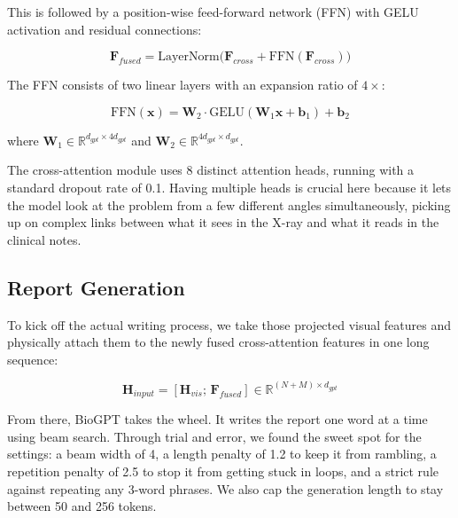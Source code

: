 \documentclass[conference]{IEEEtran}
\begin{document}
This is followed by a position-wise feed-forward network (FFN) with GELU activation and residual connections:

\begin{equation}
    \mathbf{F}_{fused} = \text{LayerNorm}\Big(\mathbf{F}_{cross} + \text{FFN}(\mathbf{F}_{cross})\Big)
\end{equation}

The FFN consists of two linear layers with an expansion ratio of $4\times$:

\begin{equation}
    \text{FFN}(\mathbf{x}) = \mathbf{W}_2 \cdot \text{GELU}(\mathbf{W}_1 \mathbf{x} + \mathbf{b}_1) + \mathbf{b}_2
\end{equation}

\noindent where $\mathbf{W}_1 \in \mathbb{R}^{d_{gpt} \times 4d_{gpt}}$ and $\mathbf{W}_2 \in \mathbb{R}^{4d_{gpt} \times d_{gpt}}$.

The cross-attention module uses 8 distinct attention heads, running with a standard dropout rate of 0.1. Having multiple heads is crucial here because it lets the model look at the problem from a few different angles simultaneously, picking up on complex links between what it sees in the X-ray and what it reads in the clinical notes.

\subsection{Report Generation}
To kick off the actual writing process, we take those projected visual features and physically attach them to the newly fused cross-attention features in one long sequence:

\begin{equation}
    \mathbf{H}_{input} = [\mathbf{H}_{vis};\, \mathbf{F}_{fused}] \in \mathbb{R}^{(N+M) \times d_{gpt}}
\end{equation}

From there, BioGPT takes the wheel. It writes the report one word at a time using beam search. Through trial and error, we found the sweet spot for the settings: a beam width of 4, a length penalty of 1.2 to keep it from rambling, a repetition penalty of 2.5 to stop it from getting stuck in loops, and a strict rule against repeating any 3-word phrases. We also cap the generation length to stay between 50 and 256 tokens.

\end{document}
